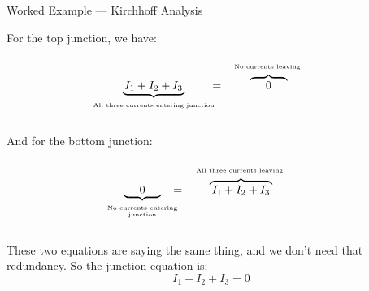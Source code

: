\documentclass{beamer}
\begin{document}
\begin{frame}{Worked Example --- Kirchhoff Analysis}

For the top junction, we have:
\begin{equation*}
    \underbrace{\hspace{0.2em} I_1 + I_2 + I_3 \hspace{0.2em}}_{\parbox[c]{0.4\textwidth}{\begin{center} \vspace{-0.7em} \tiny All three currents entering junction \end{center}}} \hspace{-2em} = \hspace{-3em} \overbrace{\hspace{1.4em} 0 \hspace{1.4em}}^{\parbox[c]{0.4\textwidth}{\begin{center} \tiny No currents leaving \vspace{-1em} \end{center}}}
\end{equation*}

And for the bottom junction:
\begin{equation*}
    \underbrace{\hspace{1.4em} 0 \hspace{1.4em}}_{\parbox[c]{0.2\textwidth}{\begin{center} \vspace{-0.7em} \tiny No currents entering junction \end{center}}} \hspace{-1em} = \hspace{-2em} \overbrace{\hspace{0.2em} I_1 + I_2 + I_3 \hspace{0.2em}}^{\parbox[c]{0.4\textwidth}{\begin{center} \tiny All three currents leaving \vspace{-1em} \end{center}}}
\end{equation*}

These two equations are saying the same thing, and we don't need that redundancy. So the junction equation is:
\begin{equation*}
    I_1 + I_2 + I_3 = 0
\end{equation*}

\end{frame}
\end{document}
